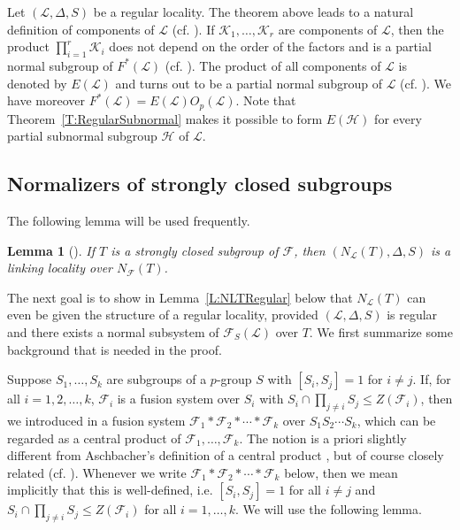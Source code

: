 \documentclass[reqno,11pt]{amsart}
\numberwithin{equation}{section}
\newtheorem{lemma}[theorem]{Lemma}
\theoremstyle{definition}
\newcommand{\F}{\mathcal{F}}
\renewcommand{\L}{\mathcal{L}}
\newcommand{\K}{\mathcal{K}}
\renewcommand{\H}{\mathcal{H}}
\begin{document}
Let $(\L,\Delta,S)$ be a regular locality. The theorem above leads to a natural definition of components of $\L$ (cf. \cite[Definition~7.9, Definition~11.1]{Henke:Regular}). If $\K_1,\dots,\K_r$ are components of $\L$, then the product $\prod_{i=1}^r\K_i$ does not depend on the order of the factors and is a partial normal subgroup of $F^*(\L)$ (cf. \cite[Proposition~11.7]{Henke:Regular}). The product of all components of $\L$ is denoted by $E(\L)$ and turns out to be a partial normal subgroup of $\L$ (cf. \cite[Lemma~11.13]{Henke:Regular}). We have moreover  $F^*(\L)=E(\L)O_p(\L)$. Note that  Theorem~\ref{T:RegularSubnormal} makes it possible to form $E(\H)$ for every partial subnormal subgroup $\H$ of $\L$.


\subsection{Normalizers of strongly closed subgroups}

The following lemma will be used frequently.

\begin{lemma}[{\cite[Lemma~3.35(b)]{Henke:Regular}}]\label{L:NLT}
If $T$ is a strongly closed subgroup of $\F$, then $(N_\L(T),\Delta,S)$ is a linking locality over $N_\F(T)$.
\end{lemma}

The next goal is to show in Lemma~\ref{L:NLTRegular} below that $N_\L(T)$ can even be given the structure of a  regular locality, provided $(\L,\Delta,S)$ is regular and there exists a normal subsystem of $\F_S(\L)$ over $T$. We first summarize some background that is needed in the proof.

\smallskip

Suppose $S_1,\dots,S_k$ are subgroups of a $p$-group $S$ with $[S_i,S_j]=1$ for $i\neq j$. If, for all $i=1,2,\dots,k$, $\F_i$ is a fusion system over $S_i$ with $S_i\cap \prod_{j\neq i}S_j\leq Z(\F_i)$, then we introduced in \cite[Section~2.5]{Chermak/Henke} a fusion system $\F_1*\F_2*\cdots *\F_k$ over $S_1S_2\cdots S_k$, which can be regarded as a central product of $\F_1,\dots,\F_k$. The notion is a priori slightly different from Aschbacher's definition of a central product \cite[p.14]{Aschbacher:2011}, but of course closely related (cf. \cite[Lemma~2.19(a),(b)]{Chermak/Henke}). Whenever we write $\F_1*\F_2*\cdots *\F_k$ below, then we mean implicitly that this is well-defined, i.e. $[S_i,S_j]=1$ for all $i\neq j$ and $S_i\cap \prod_{j\neq i}S_j\leq Z(\F_i)$ for all $i=1,\dots,k$. We will use the following lemma.
\end{document}
